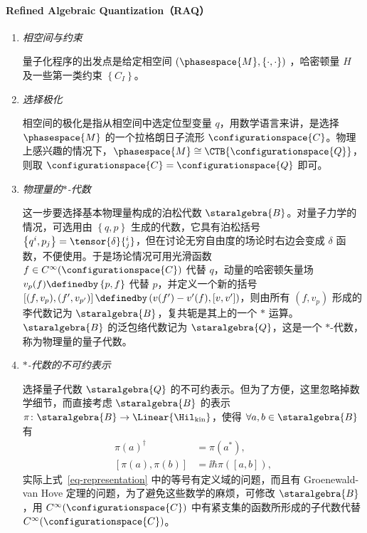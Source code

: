 		\paragraph{Refined Algebraic Quantization（RAQ）}
			\begin{enumerate}
				\item \emph{相空间与约束}

						量子化程序的出发点是给定相空间 $\left( \phasespace{M}, \{\cdot, \cdot\} \right)$ ，哈密顿量 $H$ 及一些第一类约束 $\left\{ C_I \right\}$。

				\item \emph{选择极化}
		
						相空间的极化是指从相空间中选定位型变量 ${q}$，用数学语言来讲，是选择 $\phasespace{M}$ 的一个拉格朗日子流形 $\configurationspace{C}$。物理上感兴趣的情况下，$\phasespace{M} \cong \CTB{\configurationspace{Q}}$，则取 $\configurationspace{C} = \configurationspace{Q}$ 即可。

				\item \emph{物理量的$*$-代数}
		
						这一步要选择基本物理量构成的泊松代数 $\staralgebra{B}$。对量子力学的情况，可选用由 $\left\{ {q}, {p} \right\}$ 生成的代数，它具有泊松括号 $ \left\{ q^i, p_j \right\} = \tensor{\delta}{^i_j}$，但在讨论无穷自由度的场论时右边会变成 $\delta$ 函数，不便使用。于是场论情况可用光滑函数 $f \in C^\infty(\configurationspace{C})$ 代替 $q$，动量的哈密顿矢量场 $v_p(f) \definedby \left\{ p, f \right\}$ 代替 $p$，并定义一个新的括号 $\left[ (f,v_p), \left( f',v_{p'} \right) \right] \definedby \left( v(f') - v'(f), \left[ v,v' \right] \right)$，则由所有 $(f,v_p)$ 形成的李代数记为 $\staralgebra{B}$，复共轭是其上的一个 $*$ 运算。$\staralgebra{B}$ 的泛包络代数记为 $\staralgebra{Q}$，这是一个 $*$-代数，称为物理量的量子代数。

				\item \emph{$*$-代数的不可约表示}

						选择量子代数 $\staralgebra{Q}$ 的不可约表示。但为了方便，这里忽略掉数学细节，而直接考虑 $\staralgebra{B}$ 的表示 $\pi \colon \staralgebra{B} \rightarrow \Linear{\Hil_{\text{kin}}}$，使得 $\forall a,b \in \staralgebra{B}$ 有
						\begin{equation}
							\begin{split}
								{\pi(a)}^\dagger &= \pi(a^*),\\
								\left[ \pi(a), \pi(b) \right] &= \ii \hbar \pi\left( \left[ a,b \right] \right),\label{eq-representation}
							\end{split}
						\end{equation}
						实际上式~\eqref{eq-representation} 中的等号有定义域的问题，而且有 Groenewald-van Hove 定理的问题，为了避免这些数学的麻烦，可修改 $\staralgebra{B}$ ，用 $C^\infty(\configurationspace{C})$ 中有紧支集的函数所形成的子代数代替 $C^\infty(\configurationspace{C})$。


\end{enumerate}
